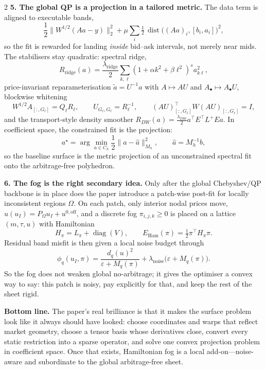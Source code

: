 \documentclass[10pt]{article}
\begin{document}
\begin{multicols}{2}
\textbf{\color{ink}5. The global QP is a projection in a tailored metric.} The data term is aligned to executable bands,
\[
\frac12\|W^{1/2}(Aa-y)\|_2^2+\mu\sum_i \tfrac12\,\operatorname{dist}\bigl((Aa)_i,[b_i,a_i]\bigr)^2,
\]
so the fit is rewarded for landing \emph{inside} bid--ask intervals, not merely near mids. The stabilisers stay quadratic: spectral ridge,
\[
R_{\mathrm{ridge}}(a)=\frac{\lambda_{\mathrm{ridge}}}{2}\sum_{k,\ell}(1+\alpha k^2+\beta \ell^2)^s a_{k\ell}^2,
\]
price-invariant reparameterisation $\tilde a=U^{-1}a$ with $A\mapsto AU$ and $A_\bullet\mapsto A_\bullet U$, blockwise whitening
\[
W^{1/2}A_{[:,G_\ell]}=Q_\ell R_\ell,\qquad U_{G_\ell,G_\ell}=R_\ell^{-1},\qquad (AU)_{[:,G_\ell]}^\top W(AU)_{[:,G_\ell]}=I,
\]
and the transport-style density smoother $R_{DW}(a)=\frac{\lambda_{DW}}{2}a^\top E^\top L^+Ea$. In coefficient space, the constrained fit is the projection:
\[
a^\star=\arg\min_{a\in C_h}\frac12\|a-\hat a\|_{M_h}^2,\qquad \hat a=M_h^{-1}b,
\]
so the baseline surface is the metric projection of an unconstrained spectral fit onto the arbitrage-free polyhedron.

\begin{fogbox}
\textbf{\color{ink}6. The fog is the right secondary idea.} Only after the global Chebyshev/QP backbone is in place does the paper introduce a patch-wise post-fit for locally inconsistent regions $\Omega$. On each patch, only interior nodal prices move, $u(u_I)=P_\Omega u_I+u^{0,\mathrm{off}}$, and a discrete fog $\pi_{i,j,k}\ge 0$ is placed on a lattice $(m,\tau,u)$ with Hamiltonian
\[
H_\pi=L_\pi+\operatorname{diag}(V),\qquad E_{\mathrm{Ham}}(\pi)=\tfrac12\pi^\top H_\pi\pi.
\]
Residual band misfit is then given a local noise budget through
\[
\phi_q(u_I,\pi)=\frac{d_q(u)^2}{\varepsilon+M_q(\pi)}+\lambda_{\mathrm{noise}}\bigl(\varepsilon+M_q(\pi)\bigr).
\]
So the fog does not weaken global no-arbitrage; it gives the optimiser a convex way to say: this patch is noisy, pay explicitly for that, and keep the rest of the sheet rigid.
\end{fogbox}

\begin{takebox}
\textbf{Bottom line.} The paper's real brilliance is that it makes the surface problem look like it always should have looked: choose coordinates and warps that reflect market geometry, choose a tensor basis whose derivatives close, convert every static restriction into a sparse operator, and solve one convex projection problem in coefficient space. Once that exists, Hamiltonian fog is a local add-on---noise-aware and subordinate to the global arbitrage-free sheet.
\end{takebox}

\end{multicols}
\end{document}

